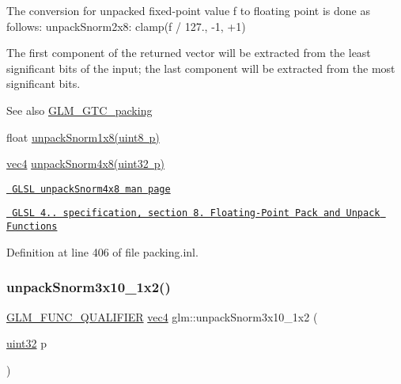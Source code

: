 The conversion for unpacked fixed-\/point value f to floating point is done as follows\+: unpack\+Snorm2x8\+: clamp(f / 127., -\/1, +1)

The first component of the returned vector will be extracted from the least significant bits of the input; the last component will be extracted from the most significant bits.

\begin{DoxySeeAlso}{See also}
\mbox{\hyperlink{group__gtc__packing}{G\+L\+M\+\_\+\+G\+T\+C\+\_\+packing}} 

float \mbox{\hyperlink{group__gtc__packing_ga6f2bebf536fbf7c8b97d4b306bb3354e}{unpack\+Snorm1x8(uint8 p)}} 

\mbox{\hyperlink{group__core__types_ga5881b1b022d7fd1b7218f5916532dd02}{vec4}} \mbox{\hyperlink{group__core__func__packing_ga4b18a0480e7260401d97f40cacd6bc36}{unpack\+Snorm4x8(uint32 p)}} 

\href{http://www.opengl.org/sdk/docs/manglsl/xhtml/unpackSnorm4x8.xml}{\texttt{ G\+L\+SL unpack\+Snorm4x8 man page}} 

\href{http://www.opengl.org/registry/doc/GLSLangSpec.4.20.8.pdf}{\texttt{ G\+L\+SL 4.. specification, section 8. Floating-\/\+Point Pack and Unpack Functions}} 
\end{DoxySeeAlso}


Definition at line 406 of file packing.\+inl.

\mbox{\label{group__gtc__packing_ga8b8bb827a3743ca553d8702d3e337101}} 
\subsubsection{\texorpdfstring{unpackSnorm3x10\_1x2()}{unpackSnorm3x10\_1x2()}}
{\footnotesize\ttfamily \mbox{\hyperlink{setup_8hpp_a33fdea6f91c5f834105f7415e2a64407}{G\+L\+M\+\_\+\+F\+U\+N\+C\+\_\+\+Q\+U\+A\+L\+I\+F\+I\+ER}} \mbox{\hyperlink{group__core__types_ga5881b1b022d7fd1b7218f5916532dd02}{vec4}} glm\+::unpack\+Snorm3x10\+\_\+1x2 (\begin{DoxyParamCaption}\item[{\mbox{\hyperlink{group__gtc__type__precision_ga202b6a53c105fcb7e531f9b443518451}{uint32}}}]{p }\end{DoxyParamCaption})}

